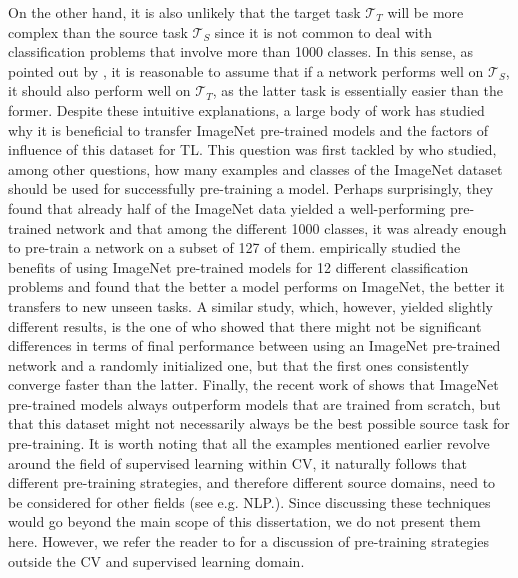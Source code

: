 On the other hand, it is also unlikely that the target task $\mathcal{T}_T$ will be more complex than the source task $\mathcal{T}_S$ since it is not common to deal with classification problems that involve more than 1000 classes. In this sense, as pointed out by \citet{mensink2021factors}, it is reasonable to assume that if a network performs well on $\mathcal{T}_S$, it should also perform well on $\mathcal{T}_T$, as the latter task is essentially easier than the former. Despite these intuitive explanations, a large body of work has studied why it is beneficial to transfer ImageNet pre-trained models and the factors of influence of this dataset for TL. This question was first tackled by \citet{huh2016makes} who studied, among other questions, how many examples and classes of the ImageNet dataset should be used for successfully pre-training a model. Perhaps surprisingly, they found that already half of the ImageNet data yielded a well-performing pre-trained network and that among the different 1000 classes, it was already enough to pre-train a network on a subset of 127 of them. \citet{kornblith2019better} empirically studied the benefits of using ImageNet pre-trained models for 12 different classification problems and found that the better a model performs on ImageNet, the better it transfers to new unseen tasks. A similar study, which, however, yielded slightly different results, is the one of \citet{he2019rethinking} who showed that there might not be significant differences in terms of final performance between using an ImageNet pre-trained network and a randomly initialized one, but that the first ones consistently converge faster than the latter. Finally, the recent work of \citet{mensink2021factors} shows that ImageNet pre-trained models always outperform models that are trained from scratch, but that this dataset might not necessarily always be the best possible source task for pre-training. It is worth noting that all the examples mentioned earlier revolve around the field of supervised learning within CV, it naturally follows that different pre-training strategies, and therefore different source domains, need to be considered for other fields (see e.g. NLP.). Since discussing these techniques would go beyond the main scope of this dissertation, we do not present them here. However, we refer the reader to \cite{mikolov2013efficient,rosset2020knowledge,brown2020language,devlin2018bert} for a discussion of pre-training strategies outside the CV and supervised learning domain.

